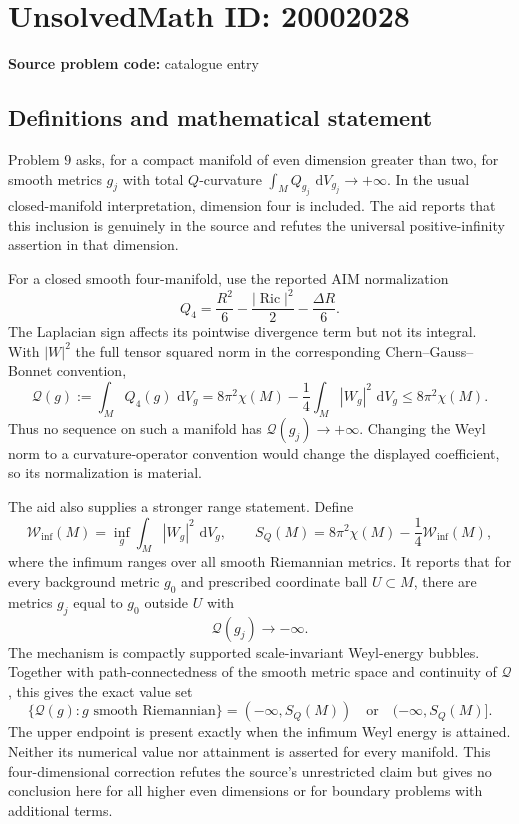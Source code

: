 \documentclass[11pt]{article}
\newcommand{\dd}{\,\mathrm{d}}
\begin{document}
\section*{UnsolvedMath ID: 20002028}
\textbf{Source problem code:} catalogue entry
\subsection{Definitions and mathematical statement}
Problem \(9\) asks, for a compact manifold of even dimension greater than two, for smooth metrics \(g_j\) with total \(Q\)-curvature \(\int_M Q_{g_j}\,\dd V_{g_j}\to+\infty\). In the usual closed-manifold interpretation, dimension four is included. The aid reports that this inclusion is genuinely in the source and refutes the universal positive-infinity assertion in that dimension.

For a closed smooth four-manifold, use the reported AIM normalization
\[
 Q_4=\frac{R^2}{6}-\frac{|\operatorname{Ric}|^2}{2}
               -\frac{\Delta R}{6}.
\]
The Laplacian sign affects its pointwise divergence term but not its integral. With \(|W|^2\) the full tensor squared norm in the corresponding Chern--Gauss--Bonnet convention,
\[
 \mathcal Q(g):=\int_MQ_4(g)\,\dd V_g
       =8\pi^2\chi(M)-\frac14\int_M|W_g|^2\,\dd V_g
       \leq8\pi^2\chi(M).
\]
Thus no sequence on such a manifold has \(\mathcal Q(g_j)\to+\infty\). Changing the Weyl norm to a curvature-operator convention would change the displayed coefficient, so its normalization is material.

The aid also supplies a stronger range statement. Define
\[
 \mathcal W_{\inf}(M)=\inf_g\int_M|W_g|^2\,\dd V_g,\qquad
 S_Q(M)=8\pi^2\chi(M)-\frac14\mathcal W_{\inf}(M),
\]
where the infimum ranges over all smooth Riemannian metrics. It reports that for every background metric \(g_0\) and prescribed coordinate ball \(U\subset M\), there are metrics \(g_j\) equal to \(g_0\) outside \(U\) with
\[
 \mathcal Q(g_j)\longrightarrow-\infty.
\]
The mechanism is compactly supported scale-invariant Weyl-energy bubbles. Together with path-connectedness of the smooth metric space and continuity of \(\mathcal Q\), this gives the exact value set
\[
 \{\mathcal Q(g):g\text{ smooth Riemannian}\}
 =(-\infty,S_Q(M))\quad\text{or}\quad(-\infty,S_Q(M)].
\]
The upper endpoint is present exactly when the infimum Weyl energy is attained. Neither its numerical value nor attainment is asserted for every manifold. This four-dimensional correction refutes the source's unrestricted claim but gives no conclusion here for all higher even dimensions or for boundary problems with additional terms.
\end{document}
